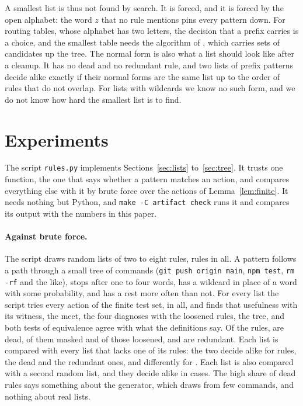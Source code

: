 \documentclass[acmsmall,nonacm,screen]{acmart}
\newcommand{\claim}[2]{#2}
\begin{document}
A smallest list is thus not found by search. It is forced, and it is forced by the open
alphabet: the word $z$ that no rule mentions pins every pattern down. For routing tables,
whose alphabet has two letters, the decision that a prefix carries is a choice, and the
smallest table needs the algorithm of \citet{Draves1999}, which carries sets of candidates up
the tree. The normal form is also what a list should look like after a cleanup. It has no
dead and no redundant rule, and two lists of prefix patterns decide alike exactly if their
normal forms are the same list up to the order of rules that do not overlap. For lists with
wildcards we know no such form, and we do not know how hard the smallest list is to find.

\section{Experiments}\label{sec:experiments}

The script \texttt{rules.py} implements Sections~\ref{sec:lists} to~\ref{sec:tree}. It trusts
one function, the one that says whether a pattern matches an action, and compares everything
else with it by brute force over the actions of Lemma~\ref{lem:finite}. It needs nothing but
Python, and \texttt{make -C artifact check} runs it and compares its output with the numbers
in this paper.

\paragraph{Against brute force.} The script draws \exLists{} random lists of two to eight
rules, \exRules{} rules in all. A pattern follows a path through a small tree of commands
(\texttt{git push origin main}, \texttt{npm test}, \texttt{rm -rf} and the like), stops after
one to four words, has a wildcard in place of a word with some probability, and has a rest
more often than not. \claim{force}{For every list the script tries every action of the finite
test set, \exActions{} in all, and finds that usefulness with its witness, the meet, the four
diagnoses with the loosened rules, the tree, and both tests of equivalence agree with what
the definitions say. Of the rules, \exDead{} are dead, \exMasked{} of them masked and
\exLoose{} of those loosened, and \exRedundant{} are redundant. Each list is compared with
every list that lacks one of its rules: the two decide alike for \exSpare{} rules, the dead
and the redundant ones, and differently for \exNeeded{}. Each list is also compared with a
second random list, and they decide alike in \exAlike{} cases.} The high share of dead rules
says something about the generator, which draws from few commands, and nothing about real
lists.
\end{document}
